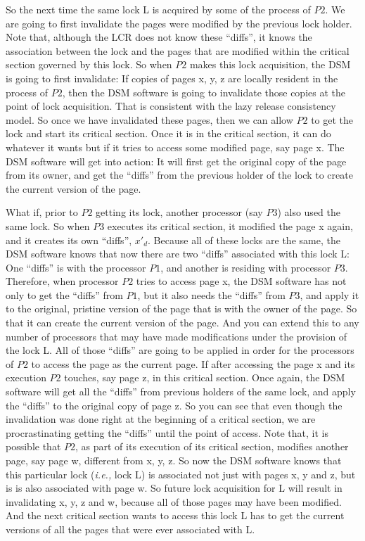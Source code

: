 \documentclass[11pt]{lecture}
\begin{document}
So the next time the same lock {\code L} is acquired by some of the process of $P2$. We are going to first invalidate 
the pages were modified by the previous lock holder. Note that, although the LCR does not know these ``diffs'', it 
knows the association between the lock and the pages that are modified within the critical section governed 
by this lock. So when $P2$ makes this lock acquisition, the DSM is going to first invalidate: If copies 
of pages {\code x, y, z} are locally resident in the process of $P2$, then the DSM software is 
going to invalidate those copies at the point of lock acquisition. That is consistent with the lazy 
release consistency model. So once we have invalidated these pages, then we can allow $P2$ to get the lock 
and start its critical section. Once it is in the critical section, it can do whatever it wants but if 
it tries to access some modified page, say page {\code x}. The DSM software will get into action: It will first 
get the original copy of the page from its owner, and get the ``diffs'' from the previous holder 
of the lock to create the current version of the page. 

What if, prior to $P2$ getting its lock, another processor (say $P3$) also used the same lock. 
So when $P3$ executes its critical section, it modified the page {\code x} again, and 
it creates its own ``diffs'', $x'_d$. Because all of these locks are the same, the DSM software 
knows that now there are two ``diffs'' associated with this lock {\code L}: One ``diffs'' is 
with the processor $P1$, and another is residing with processor $P3$. Therefore, when processor 
$P2$ tries to access page {\code x}, the DSM software has not only to get the ``diffs'' from 
$P1$, but it also needs the ``diffs'' from $P3$, and apply it to the original, pristine 
version of the page that is with the owner of the page. So that it can create the current version 
of the page. And you can extend this to any number of processors that may have made modifications 
under the provision of the lock {\code L}. All of those ``diffs'' are going to be applied in order for the 
processors of $P2$ to access the page as the current page. If after accessing the page {\code x} 
and its execution $P2$ touches, say page {\code z}, in this critical section. Once again, the DSM software 
will get all the ``diffs'' from previous holders of the same lock, and apply the ``diffs'' to the 
original copy of page {\code z}. So you can see that even though the invalidation was done 
right at the beginning of a critical section, we are procrastinating getting the 
``diffs'' until the point of access. Note that, it is possible that $P2$, as part of its execution 
of its critical section, modifies another page, say page {\code w}, different from {\code x, y, z}. 
So now the DSM software knows that this particular lock ({\it i.e.,} lock {\code L}) is associated 
not just with pages {\code x, y} and {\code z}, but is is also associated with page {\code w}. So 
future lock acquisition for {\code L} will result in invalidating {\code x, y, z} and {\code w}, because 
all of those pages may have been modified. And the next critical section wants to access this lock {\code L} 
has to get the current versions of all the pages that were ever associated with {\code L}. 
\end{document}
